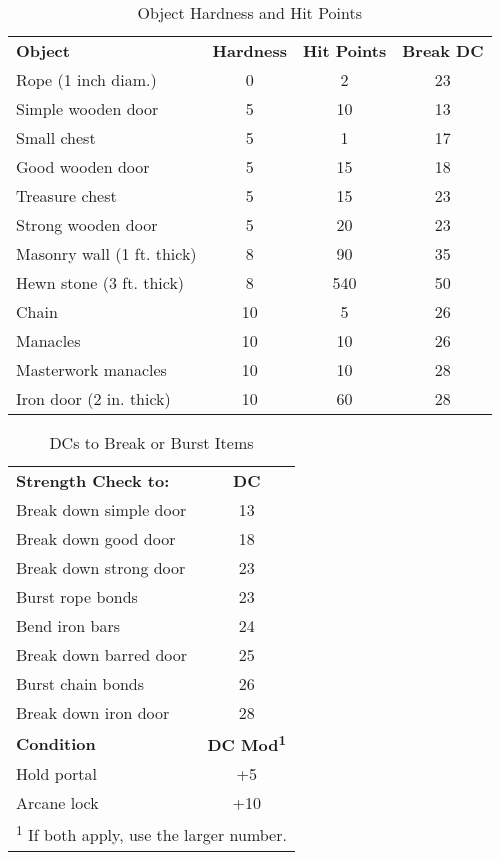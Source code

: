 \begin{table}[htb]
\caption{Object Hardness and Hit Points}
\centering
\begin{tabular}{l c c c}
\textbf{Object} & \textbf{Hardness} & \textbf{Hit Points} & \textbf{Break DC}\\
Rope (1 inch diam.) & 0 & 2 & 23\\
Simple wooden door & 5 & 10 & 13\\
Small chest & 5 & 1 & 17\\
Good wooden door & 5 & 15 & 18\\
Treasure chest & 5 & 15 & 23\\
Strong wooden door & 5 & 20 & 23\\
Masonry wall (1 ft. thick) & 8 & 90 & 35\\
Hewn stone (3 ft. thick) & 8 & 540 & 50\\
Chain & 10 & 5 & 26\\
Manacles & 10 & 10 & 26\\
Masterwork manacles & 10 & 10 & 28\\
Iron door (2 in. thick) & 10 & 60 & 28\\
\end{tabular}
\end{table}

\begin{table}[htb]
\caption{DCs to Break or Burst Items}
\centering
\begin{tabular}{l c}
\textbf{Strength Check to:} & \textbf{DC}\\
Break down simple door & 13\\
Break down good door & 18\\
Break down strong door & 23\\
Burst rope bonds & 23\\
Bend iron bars & 24\\
Break down barred door & 25\\
Burst chain bonds & 26\\
Break down iron door & 28\\
\textbf{Condition} & \textbf{DC Mod\textsuperscript{1}}\\
Hold portal & +5\\
Arcane lock & +10\\
\multicolumn{2}{l}{\textsuperscript{1} If both apply, use the larger number.}\\
\end{tabular}
\end{table}

